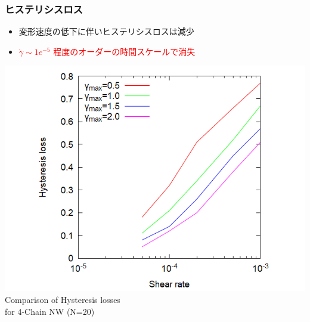 \documentclass[12pt, dvipdfmx]{beamer}
\begin{document}
\begin{frame}
	\frametitle{ヒステリシスロス}
	\begin{itemize}
		\item 変形速度の低下に伴いヒステリシスロスは減少
		\item \textcolor{red}{$\dot{\gamma} \sim 1e^{-5}$ 程度のオーダーの時間スケールで消失}
	\end{itemize}
			\centering
				\includegraphics[width=.6\textwidth]{hyst_shear.png}\\
					Comparison of Hysteresis losses \\for 4-Chain NW (N=20)
\end{frame}
\end{document}
